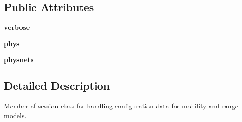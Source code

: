 \subsection*{Public Attributes}
\begin{DoxyCompactItemize}
\item 
\hypertarget{classcore_1_1mobility_1_1_mobility_manager_ac27e4223b35831e3db2543321f59dc91}{{\bfseries verbose}}\label{classcore_1_1mobility_1_1_mobility_manager_ac27e4223b35831e3db2543321f59dc91}

\item 
\hypertarget{classcore_1_1mobility_1_1_mobility_manager_a2e61ba98a86d01245a4a3f8233015046}{{\bfseries phys}}\label{classcore_1_1mobility_1_1_mobility_manager_a2e61ba98a86d01245a4a3f8233015046}

\item 
\hypertarget{classcore_1_1mobility_1_1_mobility_manager_a44a80f25d74775766d09ec786e878a70}{{\bfseries physnets}}\label{classcore_1_1mobility_1_1_mobility_manager_a44a80f25d74775766d09ec786e878a70}

\end{DoxyCompactItemize}


\subsection{Detailed Description}
\begin{DoxyVerb}Member of session class for handling configuration data for mobility and
range models.
\end{DoxyVerb}
 

